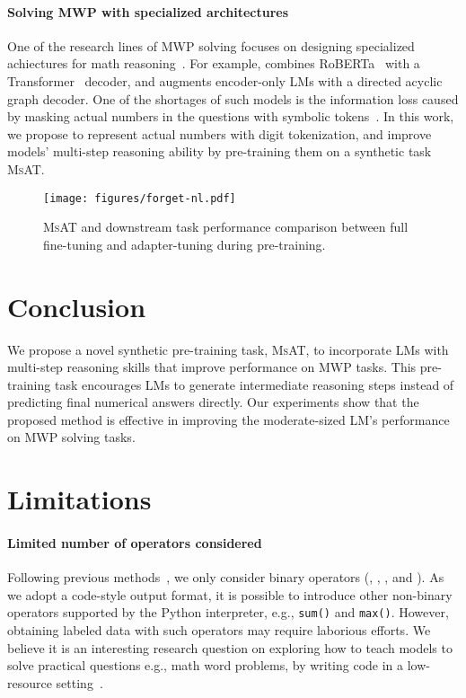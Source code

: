 \documentclass[11pt]{article}
\begin{document}
  \paragraph{Solving MWP with specialized architectures}
One of the research lines of MWP solving focuses on designing specialized achiectures 
      for math reasoning~\cite{xie2019treedecoder,lan2021mwptoolkit,jie2022deductreason}.
For example, \citet{lan2021mwptoolkit} combines RoBERTa~\cite{liu2019roberta} with a Transformer~\cite{vaswani2017transformer} decoder,
      and \citet{jie2022deductreason} augments encoder-only LMs with a directed acyclic graph decoder.
One of the shortages of such models is the information loss caused by masking actual numbers in the questions with symbolic tokens~\cite{wu2021mathnum}.
In this work, we propose to represent actual numbers with digit tokenization, 
      and improve models' multi-step reasoning ability by pre-training them on a synthetic task \textsc{MsAT}.
  



\begin{figure}[t]
    \captionsetup{type=figure}
    \centering
    \texttt{[image: figures/forget-nl.pdf]}
    \vspace{-4pt}
    \caption{
        \label{fig:ft} 
        \textsc{MsAT} and downstream task performance comparison between full fine-tuning and adapter-tuning during pre-training.
    }
\end{figure}


\section{Conclusion}

  We propose a novel synthetic pre-training task, \textsc{MsAT},
    to incorporate LMs with multi-step reasoning skills that improve performance on MWP tasks.
This pre-training task encourages LMs to generate intermediate reasoning steps instead of predicting final numerical answers directly.
Our experiments show that the proposed method is effective in improving the moderate-sized LM's performance on MWP solving tasks.


\clearpage


\section*{Limitations} \label{limit}
\paragraph{Limited number of operators considered}
    Following previous methods~\cite{lan2021mwptoolkit},
      we only consider binary operators (, , , and ).
As we adopt a code-style output format,
      it is possible to introduce other non-binary operators supported by the Python interpreter,
      e.g., \texttt{sum()} and \texttt{max()}.
However, obtaining labeled data with such operators may require laborious efforts.
We believe it is an interesting research question on exploring how to teach models to solve practical questions e.g., math word problems, by writing code in a low-resource setting~\cite{jie2023leveraging}.
\end{document}
